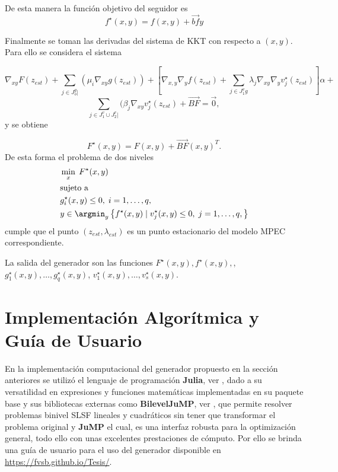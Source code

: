 De esta manera la funci\'on objetivo del seguidor es
$$f^{\star}(x,y)=f(x,y)+\vec{bf}y$$


Finalmente se toman  las derivadas del sistema de KKT con respecto a $(x,y)$. Para ello  se considera el sistema
 
    $$
       \nabla_{xy}F(z_{est})+\sum_{j\in J_o^g|}(\mu_i\nabla_{xy}g(z_{est}))+[\nabla_{x,y}\nabla_{y}f(z_{est})+\sum_{j \in J_1^vg}\lambda_j\nabla_{xy}\nabla_{y}v_{j}^{\star}(z_{est})]\alpha+$$ $$\sum_{j \in J_1^v \cup J_2^v|}(\beta_j\nabla_{xy}v_{j}^{\star}(z_{est})+\vec{BF}=\vec{0},
   $$
y se obtiene

$$F^{\star}(x,y)=F(x,y)+\vec{BF}(x,y)^T.$$
De esta forma el problema de dos niveles 
\begin{equation}
\begin{aligned}
& \min_{x} \; F^{\star}(x, y) \\
& \text{sujeto a } \\
& g_i^{\star}(x, y)\leq 0,\;i=1,\ldots,q, \\
& y \in \argmin_{y} \left\{ f^{\star}(x, y) \mid v_j^{\star}(x, y)\leq 0,\;j=1,\ldots,q ,\right\}
\end{aligned}
\end{equation}
cumple que el punto $(z_{est},\lambda_{est})$ es un punto estacionario del modelo MPEC correspondiente.

La salida del generador son las funciones $F^{\star}(x,y), f^{\star}(x,y),$, $g_1^{\star}(x,y),\ldots,g_q^{\star}(x,y)$, $v_1^{\star}(x,y),\ldots,v_s^{\star}(x,y)$.

\section{Implementación Algorítmica y Guía de Usuario}
En la implementación computacional del generador propuesto en la sección anteriores
se utilizó el lenguaje de programación \textbf{Julia}, ver \cite{Juliadocs}, dado a su versatilidad
en expresiones y funciones matemáticas implementadas en su paquete base y sus bibliotecas externas como 
\textbf{BilevelJuMP}, ver \cite{BilevelJump}, que permite resolver problemas binivel SLSF lineales y cuadráticos
sin tener que transformar el problema original y \textbf{JuMP} \cite{JuMPPaper} el cual, es una interfaz robusta para la optimización general,
todo ello con unas excelentes prestaciones de cómputo. Por ello se brinda una guía de usuario para el uso del generador disponible en 
\href{https://fvsb.github.io/Tesis/}{https://fvsb.github.io/Tesis/}.  

